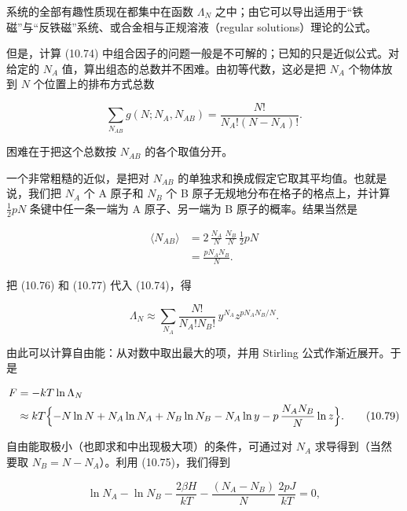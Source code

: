 系统的全部有趣性质现在都集中在函数 $\Lambda_N$ 之中；由它可以导出适用于“铁磁”与“反铁磁”系统、或合金相与正规溶液（regular solutions）理论的公式。

但是，计算 (10.74) 中组合因子的问题一般是不可解的；已知的只是近似公式。对给定的 $N_A$ 值，算出组态的总数并不困难。由初等代数，这必是把 $N_A$ 个物体放到 $N$ 个位置上的排布方式总数

\begin{equation*}
\sum_{N_{AB}} g(N; N_A, N_{AB}) = \frac{N!}{N_A! (N - N_A)!}.
\tag{10.76}
\end{equation*}

困难在于把这个总数按 $N_{AB}$ 的各个取值分开。

一个非常粗糙的近似，是把对 $N_{AB}$ 的单独求和换成假定它取其平均值。也就是说，我们把 $N_A$ 个 A 原子和 $N_B$ 个 B 原子无规地分布在格子的格点上，并计算 $\tfrac{1}{2}pN$ 条键中任一条一端为 A 原子、另一端为 B 原子的概率。结果当然是

\begin{align*}
\langle N_{AB} \rangle &= 2\, \frac{N_A}{N}\, \frac{N_B}{N}\, \tfrac{1}{2} pN \\
&= \frac{p N_A N_B}{N}.
\tag{10.77}
\end{align*}

把 (10.76) 和 (10.77) 代入 (10.74)，得

\begin{equation*}
\Lambda_N \approx \sum_{N_A} \frac{N!}{N_A! N_B!}\, y^{N_A} z^{p N_A N_B / N}.
\tag{10.78}
\end{equation*}

由此可以计算自由能：从对数中取出最大的项，并用 Stirling 公式作渐近展开。于是

\begin{align*}
F &= -kT \ln \Lambda_N \\
&\approx kT \Bigl\{ -N \ln N + N_A \ln N_A + N_B \ln N_B - N_A \ln y - p\, \frac{N_A N_B}{N} \ln z \Bigr\}.
\tag{10.79}
\end{align*}


自由能取极小（也即求和中出现极大项）的条件，可通过对 $N_A$ 求导得到（当然要取 $N_B = N - N_A$）。利用 (10.75)，我们得到

\begin{equation*}
\ln N_A - \ln N_B - \frac{2\beta H}{kT} - \frac{(N_A - N_B)}{N}\, \frac{2pJ}{kT} = 0,
\end{equation*}

